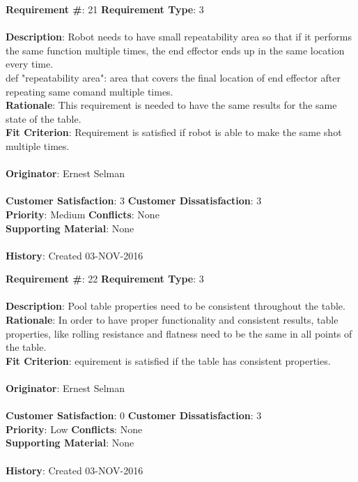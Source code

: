 \documentclass[titlepage]{article}
\begin{document}
\begin{framed}
	\noindent\textbf{Requirement \#}: 21 \hfill \textbf{Requirement Type}: 3 \hfill\\\\
	\noindent\textbf{Description}: Robot needs to have small repeatability area so that if it performs the same function multiple times, the end effector ends up in the same location every time. \\def "repeatability area": area that covers the final location of end effector after repeating same comand multiple times.\\
	\textbf{Rationale}: This requirement is needed to have the same results for the same state of the table. \\
	\textbf{Fit Criterion}: Requirement is satisfied if robot is able to make the same shot multiple times. \\\\
	\textbf{Originator}: Ernest Selman\\\\
	\noindent\textbf{Customer Satisfaction}: 3 \hfill 	\textbf{Customer Dissatisfaction}: 3 \hfill\\
	\textbf{Priority}: Medium \hfill \textbf{Conflicts}: None \hfill\\
	\textbf{Supporting Material}: None\\\\
	\noindent\textbf{History}: Created 03-NOV-2016
\end{framed}

\begin{framed}
	\noindent\textbf{Requirement \#}: 22 \hfill \textbf{Requirement Type}: 3 \hfill\\\\
	\noindent\textbf{Description}: Pool table properties need to be consistent throughout the table. \\
	\textbf{Rationale}: In order to have proper functionality and consistent results, table properties, like rolling resistance and flatness need to be the same in all points of the table. \\
	\textbf{Fit Criterion}: equirement is satisfied if the table has consistent properties. \\\\
	\textbf{Originator}: Ernest Selman\\\\
	\noindent\textbf{Customer Satisfaction}: 0 \hfill 	\textbf{Customer Dissatisfaction}: 3 \hfill\\
	\textbf{Priority}: Low \hfill \textbf{Conflicts}: None \hfill\\
	\textbf{Supporting Material}: None\\\\
	\noindent\textbf{History}: Created 03-NOV-2016
\end{framed}
\end{document}
